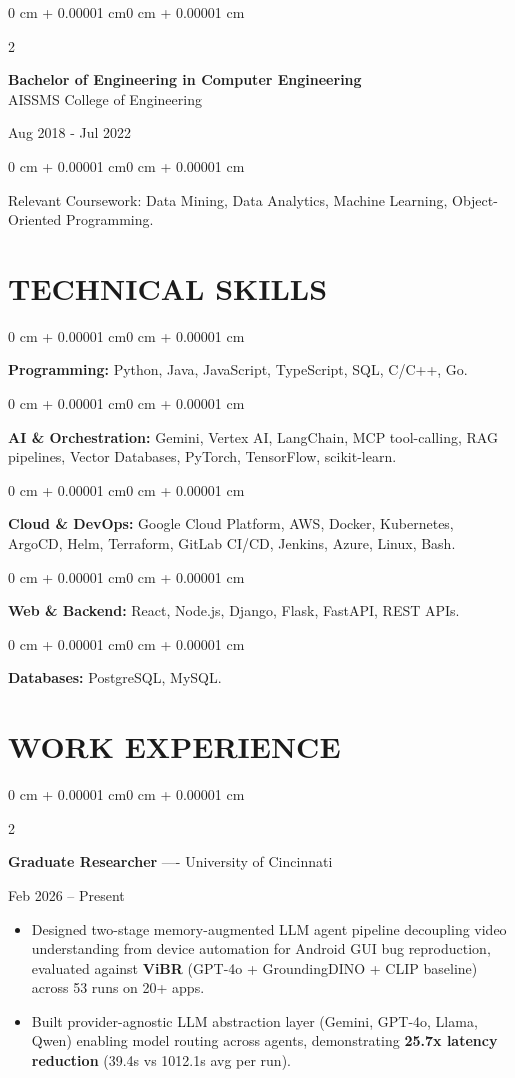\documentclass[10pt, letterpaper]{article}
\newenvironment{highlights}{
    \begin{itemize}[
        topsep=0.10 cm,
        parsep=0.06 cm,
        partopsep=0pt,
        itemsep=0.06 cm,
        leftmargin=12pt
    ]
}{
    \end{itemize}
}
\newenvironment{onecolentry}{
    \begin{adjustwidth}{0 cm + 0.00001 cm}{0 cm + 0.00001 cm}
}{
    \end{adjustwidth}
}
\newenvironment{twocolentry}[2][]{
    \onecolentry
    \def\secondColumn{#2}
    \setcolumnwidth{\fill, 4.5 cm}
    \begin{paracol}{2}
}{
    \switchcolumn \raggedleft \secondColumn
    \end{paracol}
    \endonecolentry
}
\begin{document}
\begin{twocolentry}{
    Aug 2018 - Jul 2022
}
    \textbf{Bachelor of Engineering in Computer Engineering} \\
    AISSMS College of Engineering
\end{twocolentry}
\begin{onecolentry}
Relevant Coursework: Data Mining, Data Analytics, Machine Learning, Object-Oriented Programming.
\end{onecolentry}
\section{TECHNICAL SKILLS}
\begin{onecolentry}
\textbf{Programming:} Python, Java, JavaScript, TypeScript, SQL, C/C++, Go.
\end{onecolentry}
\vspace{0.06 cm}
\begin{onecolentry}
\textbf{AI \& Orchestration:} Gemini, Vertex AI, LangChain, MCP tool-calling, RAG pipelines, Vector Databases, PyTorch, TensorFlow, scikit-learn.
\end{onecolentry}
\vspace{0.06 cm}
\begin{onecolentry}
\textbf{Cloud \& DevOps:} Google Cloud Platform, AWS, Docker, Kubernetes, ArgoCD, Helm, Terraform, GitLab CI/CD, Jenkins, Azure, Linux, Bash.
\end{onecolentry}
\vspace{0.06 cm}
\begin{onecolentry}
\textbf{Web \& Backend:} React, Node.js, Django, Flask, FastAPI, REST APIs.
\end{onecolentry}
\vspace{0.06 cm}
\begin{onecolentry}
\textbf{Databases:} PostgreSQL, MySQL.
\end{onecolentry}

\section{WORK EXPERIENCE}
\begin{twocolentry}{Feb 2026 -- Present}
\textbf{Graduate Researcher} ---- University of Cincinnati
\end{twocolentry}
\begin{highlights}
  \item Designed two-stage memory-augmented LLM agent pipeline decoupling video understanding from device automation for Android GUI bug reproduction, evaluated against \textbf{ViBR} (GPT-4o + GroundingDINO + CLIP baseline) across 53 runs on 20+ apps.
  \item Built provider-agnostic LLM abstraction layer (Gemini, GPT-4o, Llama, Qwen) enabling model routing across agents, demonstrating \textbf{25.7x latency reduction} (39.4s vs 1012.1s avg per run).
\end{highlights}
\end{document}
